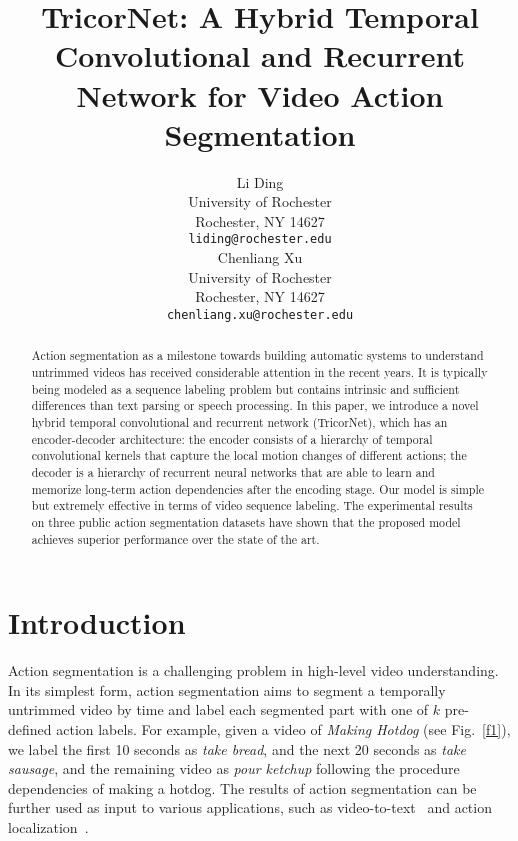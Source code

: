 \documentclass{article}
\title{TricorNet: A Hybrid Temporal Convolutional and Recurrent Network for Video Action Segmentation}
\author{
Li Ding \\
University of Rochester \\
Rochester, NY 14627 \\
\texttt{liding@rochester.edu} \\
\And
Chenliang Xu \\
University of Rochester \\
Rochester, NY 14627 \\
\texttt{chenliang.xu@rochester.edu}
}
\begin{document}

\maketitle

\begin{abstract}
Action segmentation as a milestone towards building automatic systems to understand untrimmed videos has received considerable attention in the recent years. It is typically being modeled as a sequence labeling problem but contains intrinsic and sufficient differences than text parsing or speech processing. In this paper, we introduce a novel hybrid temporal convolutional and recurrent network (TricorNet), which has an encoder-decoder architecture: the encoder consists of a hierarchy of temporal convolutional kernels that capture the local motion changes of different actions; the decoder is a hierarchy of recurrent neural networks that are able to learn and memorize long-term action dependencies after the encoding stage. Our model is simple but extremely effective in terms of video sequence labeling. The experimental results on three public action segmentation datasets have shown that the proposed model achieves superior performance over the state of the art. 
\end{abstract}



\section{Introduction}
\label{sec:intro}

Action segmentation is a challenging problem in high-level video understanding. In its simplest form, action segmentation aims to segment a temporally untrimmed video by time and label each segmented part with one of $k$ pre-defined action labels. For example, given a video of \textit{Making Hotdog} (see Fig.~\ref{f1}), we label the first 10 seconds as \textit{take bread}, and the next 20 seconds as \textit{take sausage}, and the remaining video as \textit{pour ketchup} following the procedure dependencies of making a hotdog. The results of action segmentation can be further used as input to various applications, such as video-to-text~\cite{DaXuDoCVPR2013} and action localization~\cite{MeGeSnECCV2016}. 
\end{document}
